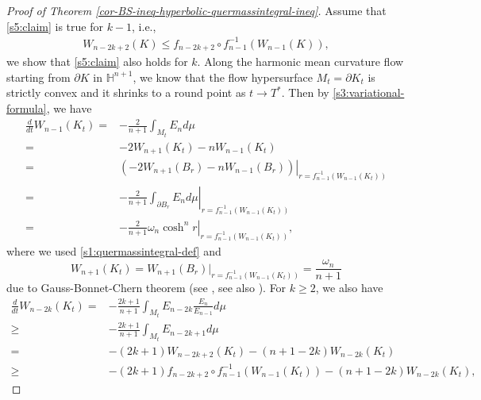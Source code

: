\documentclass[11pt,reqno]{amsart}
\theoremstyle{definition}
\theoremstyle{remark}
\numberwithin{equation}{section}
\renewcommand{\(}{\left(}
\renewcommand{\)}{\right)}
\renewcommand{\~}{\tilde}
\renewcommand{\-}{\overline}
\newcommand{\ra}{\rightarrow}
\begin{document}
\begin{proof}[Proof of Theorem \ref{cor-BS-ineq-hyperbolic-quermassintegral-ineq}]
    Assume that \eqref{s5:claim} is true for $k-1$, i.e., 
    \begin{align}\label{s5:induction}
    W_{n-2k+2}(K) \leq f_{n-2k+2}\circ f^{-1}_{n-1}(W_{n-1}(K)),
    \end{align}
    we show that \eqref{s5:claim} also holds for $k$. Along the harmonic mean curvature flow starting from $\partial K$ in $\mathbb H^{n+1}$, we know that the flow hypersurface $M_t=\partial K_t$ is strictly convex and it shrinks to a round point as $t\ra T^\ast$. Then by \eqref{s3:variational-formula}, we have
    \begin{align}\label{s5:evol-Wn-1-radial}
    \frac{d}{dt}W_{n-1}(K_t)=&-\frac{2}{n+1}\int_{M_t}E_n d\mu \nonumber\\ 
    =&-2W_{n+1}(K_t)-nW_{n-1}(K_t) \nonumber\\ 
    =&\left.\(-2W_{n+1}(B_r)-nW_{n-1}(B_r)\)\right|_{r=f_{n-1}^{-1}(W_{n-1}(K_t))}\nonumber\\ 
    =&-\left.\frac{2}{n+1}\int_{\partial B_r}E_n d\mu \right|_{r=f_{n-1}^{-1}(W_{n-1}(K_t))}\nonumber\\ 
    =&-\left.\frac{2}{n+1}\omega_n \cosh^n r \right|_{r=f_{n-1}^{-1}(W_{n-1}(K_t))},
    \end{align}
    where we used \eqref{s1:quermassintegral-def} and 
    $$
    W_{n+1}(K_t)=W_{n+1}(B_r)|_{r=f_{n-1}^{-1}(W_{n-1}(K_t))}=\frac{\omega_n}{n+1}
    $$
    due to Gauss-Bonnet-Chern theorem (see \cite{Chern1944,Chern1945}, see also \cite{Solanes06}). 
    For $k\ge 2$, we also have
    \begin{align}\label{s5:evol-Wn-2k}
    \frac{d}{dt}W_{n-2k}(K_t)=&-\frac{2k+1}{n+1}\int_{M_t} E_{n-2k}\frac{E_n}{E_{n-1}}d\mu \nonumber\\
    \geq &-\frac{2k+1}{n+1}\int_{M_t} E_{n-2k+1} d\mu \nonumber\\
    =&-(2k+1)W_{n-2k+2}(K_t)-(n+1-2k)W_{n-2k}(K_t) \nonumber\\
    \geq & -(2k+1)f_{n-2k+2}\circ f^{-1}_{n-1}(W_{n-1}(K_t))-(n+1-2k)W_{n-2k}(K_t),
    \end{align}

\end{proof}
\end{document}
